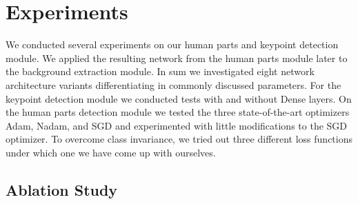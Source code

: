 

\chapter{Experiments} %

\label{Experiments} %
We conducted several experiments on our human parts and keypoint detection module.
We applied the resulting network from the human parts module later to the background extraction module.
In sum we investigated eight network architecture variants differentiating in commonly discussed parameters.
For the keypoint detection module we conducted tests with and without Dense layers.
On the human parts detection module we tested the three state-of-the-art optimizers Adam, Nadam, and SGD and experimented with little
modifications to the SGD optimizer.
To overcome class invariance, we tried out three different loss functions under which one we have come up with
ourselves.



\section{Ablation Study}




